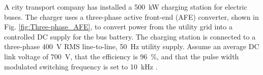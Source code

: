 
A city transport company has installed a \SI{500}{\kilo\watt} charging station for electric buses.
The charger uses a three-phase active front-end (AFE) converter, shown in Fig. \ref{fig:Three-phase_AFE}, to convert power from the
utility grid into a controlled DC supply for the bus battery.
The charging station is connected to a three-phase \SI{400}{\volt} RMS line-to-line, \SI{50}{\hertz} utility
supply. Assume an average DC link voltage of \SI{700}{\volt}, that the efficiency is \SI{96}{\percent}, and that the pulse width modulated switching frequency is set to \SI{10}{\kilo\hertz} .

